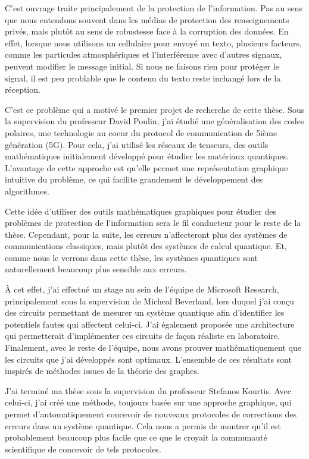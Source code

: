 \begin{comment}
\end{comment}

C'est ouvrage traite principalement de la protection de
l'information. 
Pas au sens que nous entendons souvent dans les médias de protection des renseignements privés,
mais plutôt au sens de robustesse face à la corruption des données.
En effet,
lorsque nous utilisons un cellulaire pour envoyé un texto,
plusieurs facteurs, 
comme les particules atmosphériques et l'interférence avec d'autres signaux,
peuvent modifier le message initial.
Si nous ne faisons rien pour protéger le signal,
il est peu problable que le contenu du texto reste inchangé
lors de la réception.

C'est ce problème qui a motivé le premier projet 
de recherche de cette thèse.
Sous la supervision du professeur David Poulin,
j'ai étudié une généralisation des codes polaires,
une technologie au coeur du protocol de communication de 5ième génération (5G).
Pour cela,
j'ai utilisé les réseaux de tenseurs, 
des outils mathématiques initialement développé pour étudier
les matériaux quantiques.
L'avantage de cette approche est qu'elle permet une représentation
graphique intuitive du problème, 
ce qui facilite grandement le développement des algorithmes.

Cette idée d'utiliser des outils mathématiques graphiques pour 
étudier des problèmes de protection de l'information
sera le fil conducteur pour le reste de la thèse.
Cependant, 
pour la suite, 
les erreurs n'affecteront plus des systèmes de communications classiques,
mais plutôt des systèmes de calcul quantique.
Et, comme nous le verrons dans cette thèse,
les systèmes quantiques sont naturellement beaucoup plus sensible aux erreurs.

À cet effet, 
j'ai effectué un stage au sein de l'équipe de Microsoft Research,
principalement sous la supervision de Micheal Beverland, 
lors duquel j'ai conçu des circuits permettant de mesurer un système quantique afin d'identifier
les potentiels fautes qui affectent celui-ci.
J'ai également proposée une architecture qui permetterait d'implémenter ces circuits
de façon réaliste en laboratoire.
Finalement, avec le reste de l'équipe, 
nous avons prouver mathématiquement que les circuits que j'ai développés sont optimaux.
L'ensemble de ces résultats sont inspirés de méthodes issues de la théorie des graphes.

J'ai terminé ma thèse sous la supervision du professeur Stefanos Kourtis.
Avec celui-ci,
j'ai créé une méthode, toujours basée sur une approche graphique, 
qui permet d'automatiquement concevoir de nouveaux protocoles de 
corrections des erreurs dans un système quantique.
Cela nous a permis de montrer qu'il est probablement beaucoup plus facile 
que ce que le croyait la communauté scientifique de concevoir de tels protocoles.

